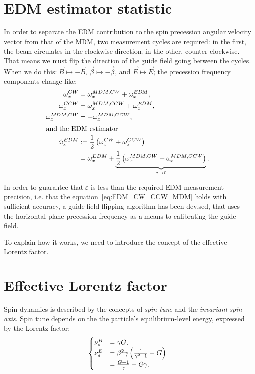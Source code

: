 \documentclass[a4paper]{jacow}
\newcommand{\w}{\omega}
\begin{document}
\section{EDM estimator statistic}
In order to separate the EDM contribution to the spin precession angular velocity vector from that of the MDM,
two measurement cycles are required: in the first, the beam circulates in the clockwise direction; in the other,
counter-clockwise. That means we must flip the direction of the guide field going between the cycles.
When we do this: 
$\vec B \mapsto -\vec B$, $\vec\beta \mapsto -\vec\beta$, and $\vec E \mapsto \vec E$;
the precession frequency components change like:
\begin{subequations}
  \begin{align}
    \w_x^{CW} &= \w_x^{MDM, CW}   + \w_x^{EDM}, \notag\\
    \w_x^{CCW} &= \w_x^{MDM, CCW} + \w_x^{EDM}, \notag\\
    \w_x^{MDM, CW} &= -\w_x^{MDM, CCW}, \label{eq:FDM_CW_CCW_MDM}\\
    \intertext{and the EDM estimator}
    \hat\w_x^{EDM} &:= \frac12\bkt{\w_x^{CW} + \w_x^{CCW}} \label{eq:FDM_estimator} \\
                   &=  \w_x^{EDM} +
                       \underbrace{\frac12\bkt{\w_x^{MDM, CW} + \w_x^{MDM, CCW}}}_{\varepsilon \to 0}.
  \end{align}
\end{subequations}

In order to guarantee that $\varepsilon$ is less than the required EDM measurement precision, i.e.
that the equation~\eqref{eq:FDM_CW_CCW_MDM} holds with sufficient accuracy, a guide field flipping algorithm
has been devised, that uses the horizontal plane precession frequency as a means to calibrating the guide field. 

To explain how it works, we need to introduce the concept of the effective Lorentz factor.

\section{Effective Lorentz factor}
Spin dynamics is described by the concepts of \emph{spin tune} and the \emph{invariant spin axis}.
Spin tune depends on the the particle's  equilibrium-level energy, expressed by the Lorentz factor:
\begin{equation}
  \begin{cases}
    \nu_s^B &= \gamma G, \\
    \nu_s^E &= \beta^2\gamma\bkt{\frac{1}{\gamma^2-1} - G} \\
            &= \frac{G+1}{\gamma} - G\gamma.
  \end{cases}
\end{equation}
\end{document}
